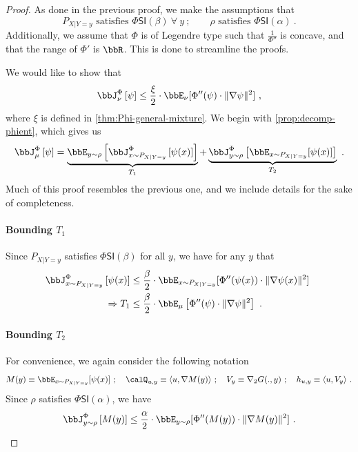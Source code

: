 \documentclass[11pt]{article}
\newcommand{\PhiSI}[1]{\Phi\mathsf{SI}\left(#1\right)}
\newcommand{\Phient}[3]{
    \ensuremath{\if$#3$\bbJ_{#1}^{#2}\else\bbJ_{#1}^{#2}\left[#3\right]\fi}}
\begin{document}
\begin{proof}
As done in the previous proof, we make the assumptions that
\begin{equation*}
    P_{X | Y = y} \text{ satisfies } \PhiSI{\beta} ~\forall ~ y~;\qquad \rho \text{ satisfies } \PhiSI{\alpha}~.
\end{equation*}
Additionally, we assume that \(\Phi\) is of Legendre type such that \(\frac{1}{\Phi''}\) is concave, and that the range of \(\Phi'\) is \(\bbR\).
This is done to streamline the proofs.

We would like to show that
\begin{equation*}
    \Phient{\nu}{\Phi}{\psi} \leq \frac{\xi}{2} \cdot \bbE_{\nu}[\Phi''(\psi) \cdot \|\nabla \psi\|^{2}]~,
\end{equation*}
where \(\xi\) is defined in \cref{thm:Phi-general-mixture}.
We begin with \cref{prop:decomp-phient}, which gives us
\begin{equation*}
    \Phient{\mu}{\Phi}{\psi} = \underbrace{\bbE_{y \sim \rho}\left[\Phient{x \sim P_{X | Y = y}}{\Phi}{\psi(x)}\right]}_{T_{1}} + \underbrace{\Phient{y \sim \rho}{\Phi}{\bbE_{x \sim P_{X | Y = y}}[\psi(x)]}}_{T_{2}}~.
\end{equation*}
Much of this proof resembles the previous one, and we include details for the sake of completeness.

\paragraph{Bounding \(T_{1}\)}
Since \(P_{X | Y = y}\) satisfies \(\PhiSI{\beta}\) for all \(y\), we have for any \(y\) that
\begin{align*}
    \Phient{x \sim P_{X | Y =y}}{\Phi}{\psi(x)} &\leq \frac{\beta}{2} \cdot \bbE_{x \sim P_{X | Y = y}}[\Phi''(\psi(x)) \cdot \|\nabla\psi(x)\|^{2}]~ \\
    \Rightarrow T_{1} &\leq \frac{\beta}{2} \cdot \bbE_{\mu}\left[\Phi''(\psi) \cdot \|\nabla\psi\|^{2}\right]~.
\end{align*}

\paragraph{Bounding \(T_{2}\)}
For convenience, we again consider the following notation
\begin{equation*}
    M(y) \equiv \bbE_{x \sim P_{X | Y = y}}[\psi(x)]~; \quad \calQ_{u, y} \equiv \langle u, \nabla M(y)\rangle~; \quad V_{y} \equiv \nabla_{2}G(., y)~; \quad h_{u, y} \equiv \langle u, V_{y}\rangle~.
\end{equation*}
Since \(\rho\) satisfies \(\PhiSI{\alpha}\), we have
\begin{equation*}
    \Phient{y \sim \rho}{\Phi}{M(y)} \leq \frac{\alpha}{2} \cdot \bbE_{y \sim \rho}[\Phi''(M(y)) \cdot \|\nabla M(y)\|^{2}]~.
\end{equation*}


\end{proof}
\end{document}
